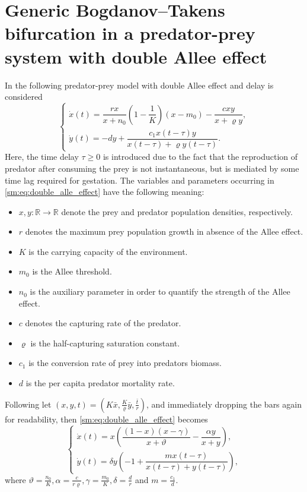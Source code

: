 \section[Predator-prey system with double Allee effect]
        {Generic Bogdanov--Takens bifurcation in a predator-prey system with double Allee effect}
In \cite{Jiao2021} the following predator-prey model with double Allee effect
and delay is considered
\begin{equation}
\label{sm:eq:double_alle_effect}
\begin{cases}
    \dot x(t) = \dfrac{rx}{x+n_0}\left(1-\dfrac1 K\right)\left(x - m_0\right) - \dfrac{cxy}{x+\varrho y},\\
    \dot y(t) = -dy + \dfrac{c_1 x(t-\tau)y}{x(t-\tau) + \varrho y(t-\tau)}.
\end{cases}
\end{equation}
Here, the time delay $\tau \geq 0$ is introduced due to the fact that the
reproduction of predator after consuming the prey is not instantaneous, but is
mediated by some time lag required for gestation.
The variables and parameters occurring in \cref{sm:eq:double_alle_effect}
have the following meaning:
\begin{itemize}
\item $x,y\colon \mathbb R \rightarrow \mathbb R$ denote the prey and predator population densities, respectively.
\item $r$ denotes the maximum prey population growth in absence of the Allee effect.
\item $K$ is the carrying capacity of the environment.
\item $m_0$ is the Allee threshold.
\item $n_0$ is the auxiliary parameter in order to quantify the strength of the Allee effect.
\item $c$ denotes the capturing rate of the predator.
\item $\varrho$ is the half-capturing saturation constant.
\item $c_1$ is the conversion rate of prey into predators biomass.
\item $d$ is the per capita predator mortality rate.
\end{itemize}
Following \cite{Jiao2021} let $(x,y,t) = \left(K\bar x, \frac K \varrho \bar y, \frac{\bar t}r\right)$, and immediately 
dropping the bars again for readability, then \cref{sm:eq:double_alle_effect} becomes
\begin{equation}
\label{sm:eq:double_alle_effect_rescaled}
\begin{cases}
    \dot x(t) = x \left( \dfrac{(1-x)(x-\gamma)}{x+\vartheta} - \dfrac{\alpha y}{x+y} \right), \\
    \dot y(t) = \delta y \left( -1 + \dfrac{ m x(t-\tau) }{ x(t-\tau) + y(t-\tau) }\right),
\end{cases}
\end{equation}
where $\vartheta = \frac{n_0}K, \alpha=\frac c{r\varrho}, \gamma = \frac{m_0}K, \delta = \frac dr$ and $m=\frac{c_1}d$.


